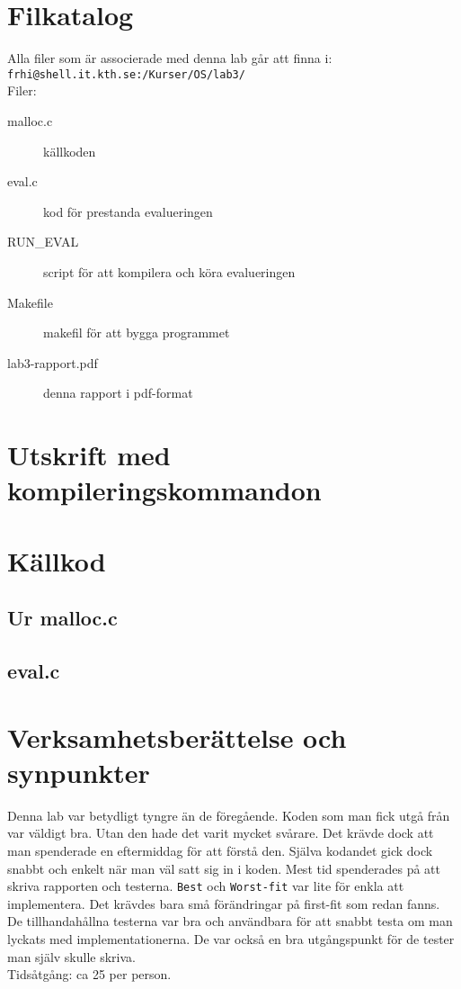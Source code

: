 \documentclass[a4paper]{article}
\begin{document}
\section*{Filkatalog}
Alla filer som är associerade med denna lab går att finna i:\\
\texttt{frhi@shell.it.kth.se:/Kurser/OS/lab3/}
\\
Filer:
\begin{description}
\item[malloc.c] källkoden
\item[eval.c] kod för prestanda evalueringen
\item[RUN\_EVAL] script för att kompilera och köra evalueringen
\item[Makefile] makefil för att bygga programmet
\item[lab3-rapport.pdf] denna rapport i pdf-format
\end{description}

\section*{Utskrift med kompileringskommandon}


\section*{Källkod}
\subsection*{Ur malloc.c}


\subsection*{eval.c}


\section*{Verksamhetsberättelse och synpunkter}
Denna lab var betydligt tyngre än de föregående. Koden som man fick utgå från var väldigt bra. Utan den hade det varit mycket svårare. Det krävde dock att man spenderade en eftermiddag för att förstå den. Själva kodandet gick dock snabbt och enkelt när man väl satt sig in i koden. Mest tid spenderades på att skriva rapporten och testerna. \texttt{Best} och \texttt{Worst-fit} var lite för enkla att implementera. Det krävdes bara små förändringar på first-fit som redan fanns.
\\
De tillhandahållna testerna var bra och användbara för att snabbt testa om man lyckats med implementationerna. De var också en bra utgångspunkt för de tester man själv skulle skriva.
\\
Tidsåtgång: ca 25 per person.
\end{document}
